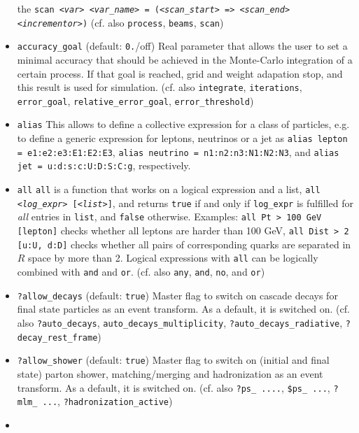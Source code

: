 \documentclass[12pt]{book}
\newcommand{\ttt}[1]{\texttt{#1}}
\begin{document}
\begin{itemize}
the \ttt{scan {\em <var>} {\em <var\_name>} = ({\em <scan\_start>} => {\em <scan\_end>}
  {\em <incrementor>})} (cf. also \ttt{process}, \ttt{beams}, \ttt{scan})
\item
\ttt{accuracy\_goal} \qquad (default: \ttt{0.}/off) \newline
Real parameter that allows the user to set a minimal accuracy that
should be achieved in the Monte-Carlo integration of a certain
process. If that goal is reached, grid and weight adapation stop, and
this result is used for simulation. (cf. also \ttt{integrate},
\ttt{iterations}, \ttt{error\_goal}, \ttt{relative\_error\_goal},
\ttt{error\_threshold}) 
\item 
\ttt{alias} \newline
This allows to define a collective expression for a class of
particles, e.g. to define a generic expression for leptons, neutrinos
or a jet as \ttt{alias lepton = e1:e2:e3:E1:E2:E3}, \ttt{alias
neutrino = n1:n2:n3:N1:N2:N3}, and \ttt{alias jet =
u:d:s:c:U:D:S:C:g}, respectively.
\item 
\ttt{all} \newline
\ttt{all} is a function that works on a logical expression and a list, 
\ttt{all {\em <log\_expr>} [{\em <list>}]}, and returns \ttt{true} if and only if
\ttt{log\_expr} is fulfilled for {\em all} entries in \ttt{list}, and
\ttt{false} otherwise. Examples: \ttt{all Pt > 100 GeV [lepton]}
checks whether all leptons are harder than 100 GeV, \ttt{all Dist > 2
  [u:U, d:D]} checks whether all pairs of corresponding quarks
are separated in $R$ space by more than 2. Logical expressions with
\ttt{all} can be logically combined with \ttt{and} and
\ttt{or}. (cf. also \ttt{any}, \ttt{and}, \ttt{no}, and \ttt{or}) 
\item
\ttt{?allow\_decays} \qquad (default: \ttt{true}) \newline
Master flag to switch on cascade decays for final state particles as
an event transform. As a default, it is switched on. (cf. also
\ttt{?auto\_decays}, \ttt{auto\_decays\_multiplicity},
\ttt{?auto\_decays\_radiative}, \ttt{?decay\_rest\_frame})
\item
\ttt{?allow\_shower} \qquad (default: \ttt{true}) \newline
Master flag to switch on (initial and final state) parton shower,
matching/merging and hadronization as an event transform. As a
default, it is switched on. (cf. also \ttt{?ps\_ ....}, \ttt{\$ps\_
  ...}, \ttt{?mlm\_ ...}, \ttt{?hadronization\_active}) 
\item

\end{itemize}
\end{document}

